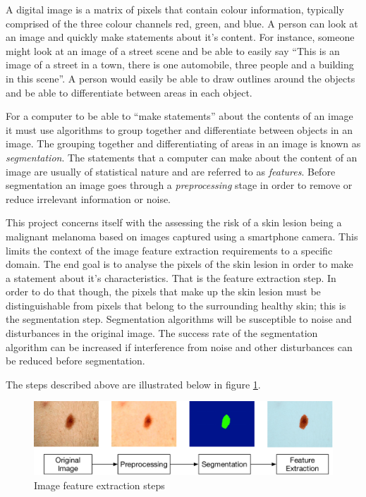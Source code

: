 A digital image is a matrix of pixels that contain colour information, typically comprised of the three colour channels red, green, and blue. A person can look at an image and quickly make statements about it’s content. For instance, someone might look at an image of a street scene and be able to easily say “This is an image of a street in a town, there is one automobile, three people and a building in this scene”. A person would easily be able to draw outlines around the objects and be able to differentiate between areas in each object.

For a computer to be able to “make statements” about the contents of an image it must use algorithms to group together and differentiate between objects in an image. The grouping together and differentiating of areas in an image is known as \textit{segmentation}. The statements that a computer can make about the content of an image are usually of statistical nature and are referred to as \textit{features}. Before segmentation an image goes through a \textit{preprocessing} stage in order to remove or reduce irrelevant information or noise.

This project concerns itself with the assessing the risk of a skin lesion being a malignant melanoma based on images captured using a smartphone camera. This limits the context of the image feature extraction requirements to a specific domain. The end goal is to analyse the pixels of the skin lesion in order to make a statement about it’s characteristics. That is the feature extraction step. In order to do that though, the pixels that make up the skin lesion must be distinguishable from pixels that belong to the surrounding healthy skin; this is the segmentation step. Segmentation algorithms will be susceptible to noise and disturbances in the original image. The success rate of the segmentation algorithm can be increased if interference from noise and other disturbances can be reduced before segmentation.

The steps described above are illustrated below in figure \ref{fig:steps}.

\begin{figure}[H]
    \includegraphics[width=\textwidth,keepaspectratio]{assets/image_processing/steps.pdf}
    \caption{Image feature extraction steps}
    \label{fig:steps}
\end{figure}





